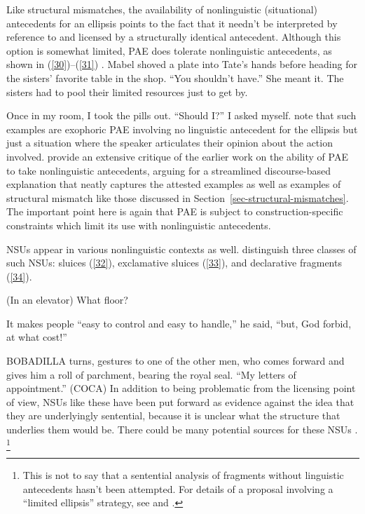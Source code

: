 {Like structural mismatches, the availability of nonlinguistic (situational) antecedents for an ellipsis points to the fact that it needn't be interpreted by reference to and licensed by a structurally identical antecedent. Although this option is somewhat limited, PAE does tolerate nonlinguistic antecedents, as shown in (\ref{30})--(\ref{31}) \citep[see also][]{Hankamer1976, Schachter1977}.
\ea Mabel shoved a plate into Tate's hands before heading for the sisters' favorite table in the shop. ``You shouldn't have.'' She meant it. The sisters had to pool their limited resources
just to get by. \citep[ex.\ 23]{Miller2014b}\label{30}\z

\ea Once in my room, I took the pills out. ``Should I?'' I asked myself. \citep[ex.\ 22a]{Miller2014b}\label{31}\z
%
\citet{Miller2014b} note that such examples are exophoric PAE
involving no linguistic antecedent for the ellipsis but 
just a situation where the speaker articulates their opinion about the action involved. \citet{Miller2014b} provide an extensive critique of the earlier work on the ability of PAE to take nonlinguistic antecedents, arguing for a streamlined discourse-based explanation that neatly captures the attested examples as well as examples of structural mismatch like those discussed in Section~\ref{sec-structural-mismatches}. The important point here is again that PAE is subject to construction-specific constraints which limit its use with nonlinguistic antecedents.

NSUs appear in various nonlinguistic contexts as well. \citet{Ginzburg2018} distinguish three classes of such NSUs: sluices (\ref{32}), exclamative sluices (\ref{33}), and declarative fragments (\ref{34}).

\ea (In an elevator) What floor? \citep[298]{Ginzburg:Sag:2000}\label{32}\z

\ea It makes people ``easy to control and easy to handle,'' he said, ``but, God forbid, at what cost!'' \citep[96]{Ginzburg2018}
\label{33}\z

\ea BOBADILLA turns, gestures to one of the other men, who comes forward and gives him a roll of parchment, bearing the royal seal. ``My letters of appointment.'' (COCA)\label{34}\z
%
In addition to being problematic from the licensing point of view, NSUs like these have been put forward as evidence against the idea that they are underlyingly sentential, because it is unclear what the structure that underlies them would be. There could be many potential sources for
these NSUs 
\citep[see][306]{CJ2005a}. %
\footnote{This is not to say that a sentential analysis of fragments without linguistic antecedents hasn't been attempted. For details of a proposal involving a ``limited ellipsis'' strategy, see \citet{Merchant2005a} and \citet{Merchant2010}.}


}
